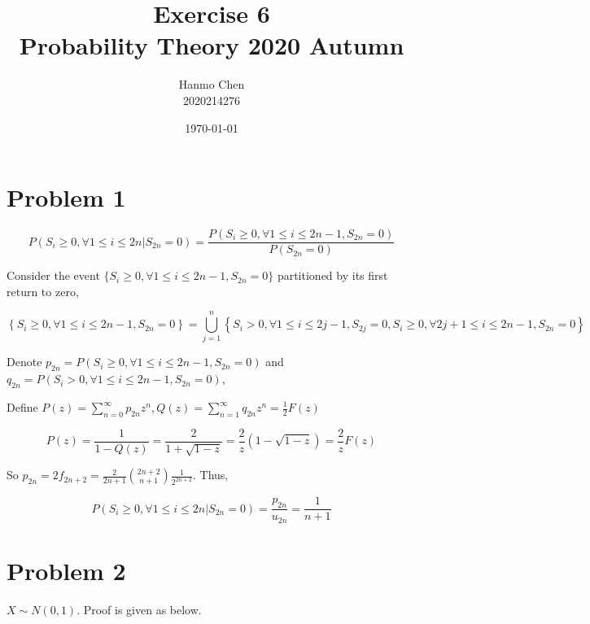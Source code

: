 \documentclass{article}
\title{Exercise 6 \\ Probability Theory 2020 Autumn}
\author{Hanmo Chen \\ 2020214276}
\date{\today}
\begin{document}
\maketitle

\section{Problem 1}

\begin{equation}
    P(S_i\geqslant 0, \forall 1\leqslant i \leqslant 2n |S_{2n} = 0 ) = \frac{P(S_i\geqslant 0, \forall 1\leqslant i \leqslant 2n-1 ,S_{2n} = 0 )}{P(S_{2n} = 0)}
\end{equation}

Consider the event $\{S_i\geqslant 0, \forall 1\leqslant i \leqslant 2n-1 ,S_{2n} = 0\}$ partitioned by its first return to zero,

\begin{equation}
    \left\{S_i\geqslant 0, \forall 1\leqslant i \leqslant 2n-1 ,S_{2n} = 0\right\} = \bigcup_{j=1}^{n}\left\{S_i> 0, \forall 1\leqslant i \leqslant 2j-1 ,S_{2j} = 0,S_{i} \geqslant 0,\forall 2j+1\leqslant i \leqslant 2n-1,S_{2n} = 0 \right\}
\end{equation}

Denote $p_{2n} = P(S_i\geqslant 0, \forall 1\leqslant i \leqslant 2n-1 ,S_{2n} = 0 )$ and $q_{2n} = P(S_i> 0, \forall 1\leqslant i \leqslant 2n-1 ,S_{2n} = 0 )$,

Define $P(z)= \sum_{n=0}^{\infty} p_{2n} z^n , Q(z) = \sum_{n=1}^{\infty}q_{2n} z^n = \frac{1}{2} F(z)$


\begin{equation}
    P(z) = \frac{1}{1- Q (z)} = \frac{2}{1+\sqrt{1-z}} = \frac{2}{z} (1-\sqrt{1-z}) =\frac{2}{z} F(z)
\end{equation}


So $p_{2n} =2f_{2n+2} = \frac{2}{2n+1} \binom{2n+2}{n+1} \frac{1}{2^{2n+2}}$. Thus,

\begin{equation}
    P(S_i\geqslant 0, \forall 1\leqslant i \leqslant 2n |S_{2n} = 0 ) =  \frac{p_{2n}}{u_{2n}} = \frac{1}{n+1}
\end{equation}


\section{Problem 2}


$X\sim N(0,1)$. Proof is given as below.
\end{document}
